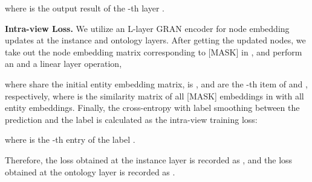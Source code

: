 \documentclass[letterpaper]{article} \usepackage{aaai23}  \usepackage{times}  \usepackage{helvet}  \usepackage{courier}  \usepackage[hyphens]{url}  \usepackage{graphicx} \urlstyle{rm} \def\UrlFont{\rm}  \usepackage{natbib}  \usepackage{caption} \frenchspacing  \setlength{\pdfpagewidth}{8.5in}  \setlength{\pdfpageheight}{11in}  \usepackage{times}
\begin{document}
where  is the output result of the -th layer .

\textbf{Intra-view Loss. } We utilize an L-layer GRAN encoder for node embedding updates at the instance and ontology layers. After getting the updated nodes, we take out the node embedding matrix  corresponding to [MASK] in , and perform an  and a linear layer operation,

where  share the initial entity embedding matrix,  is ,  and  are the -th item of  and , respectively, where  is the similarity matrix of all [MASK] embeddings in  with all entity embeddings. Finally, the cross-entropy with label smoothing between the prediction and the label is calculated as the intra-view training loss:

where  is the -th entry of the label .

Therefore, the loss obtained at the instance layer is recorded as , and the loss obtained at the ontology layer is recorded as .
\end{document}
